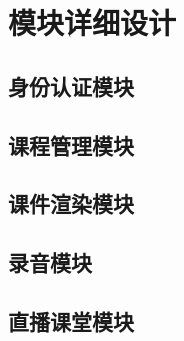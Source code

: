 \chapter{模块详细设计}

\section{身份认证模块}


\section{课程管理模块}


\section{课件渲染模块}


\section{录音模块}


\section{直播课堂模块}

